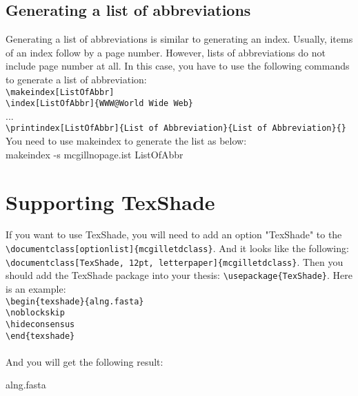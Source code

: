 \documentclass[12pt,Bold,letterpaper,TexShade]{mcgilletdclass}
\begin{document}
\section{Generating a list of abbreviations}
Generating a list of abbreviations is similar to generating an index. Usually, items of an index 
follow by a page number. However, lists of abbreviations do not include page number at all. In this
case, you have to use the following commands to generate a list of abbreviation:\\
	\verb=\makeindex[ListOfAbbr]=\\
	\verb=\index[ListOfAbbr]{WWW@World Wide Web}=\\
	...\\
	\verb=\printindex[ListOfAbbr]{List of Abbreviation}{List of Abbreviation}{}=\\
	
	You need to use makeindex to generate the list as below: \\
	makeindex -s mcgillnopage.ist ListOfAbbr \\
	
	



\chapter{Supporting TexShade}
If you want to use TexShade, you will need to add an option "TexShade" to the 
\verb=\documentclass[optionlist]{mcgilletdclass}=. And it looks like the following: \\
\verb=\documentclass[TexShade, 12pt, letterpaper]{mcgilletdclass}=. Then you should add
the TexShade package into your thesis: \verb=\usepackage{TexShade}=. Here is an example: \\
	\verb=\begin{texshade}{alng.fasta}= \\
	\verb=\noblockskip= \\
	\verb=\hideconsensus= \\
	\verb=\end{texshade}= \\
\\
And you will get the following result:\\%
\begin{texshade}{alng.fasta}
	\noblockskip
	\hideconsensus
\end{texshade}


%
%
%
%





\end{document}
